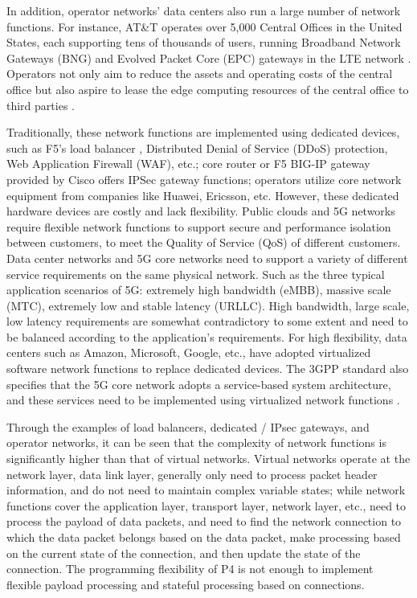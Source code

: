 In addition, operator networks' data centers also run a large number of network functions. For instance, AT\&T operates over 5,000 Central Offices in the United States, each supporting tens of thousands of users, running Broadband Network Gateways (BNG) and Evolved Packet Core (EPC) gateways in the LTE network \cite{chang-lan-thesis}. Operators not only aim to reduce the assets and operating costs of the central office but also aspire to lease the edge computing resources of the central office to third parties \cite{chang-lan-thesis}.

Traditionally, these network functions are implemented using dedicated devices, such as F5's load balancer \cite{f5-load-balancer}, Distributed Denial of Service (DDoS) protection, Web Application Firewall (WAF), etc.; core router or F5 BIG-IP gateway provided by Cisco offers IPSec gateway functions; operators utilize core network equipment from companies like Huawei, Ericsson, etc. However, these dedicated hardware devices are costly and lack flexibility. Public clouds and 5G networks require flexible network functions to support secure and performance isolation between customers, to meet the Quality of Service (QoS) of different customers. Data center networks and 5G core networks need to support a variety of different service requirements on the same physical network. Such as the three typical application scenarios of 5G: extremely high bandwidth (eMBB), massive scale (MTC), extremely low and stable latency (URLLC). High bandwidth, large scale, low latency requirements are somewhat contradictory to some extent and need to be balanced according to the application's requirements. For high flexibility, data centers such as Amazon, Microsoft, Google, etc., have adopted virtualized software network functions to replace dedicated devices. The 3GPP standard also specifies that the 5G core network adopts a service-based system architecture, and these services need to be implemented using virtualized network functions \cite{3gpp-23501,3gpp-38300}.

Through the examples of load balancers, dedicated / IPsec gateways, and operator networks, it can be seen that the complexity of network functions is significantly higher than that of virtual networks. Virtual networks operate at the network layer, data link layer, generally only need to process packet header information, and do not need to maintain complex variable states; while network functions cover the application layer, transport layer, network layer, etc., need to process the payload of data packets, and need to find the network connection to which the data packet belongs based on the data packet, make processing based on the current state of the connection, and then update the state of the connection. The programming flexibility of P4 \cite{bosshart2013forwarding} is not enough to implement flexible payload processing and stateful processing based on connections.

